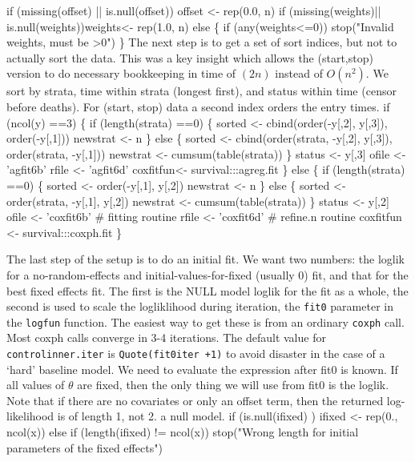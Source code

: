 \documentclass{article}
\begin{document}
    if (missing(offset) || is.null(offset)) offset <- rep(0.0, n)
    if (missing(weights)|| is.null(weights))weights<- rep(1.0, n)
    else \{
        if (any(weights<=0)) stop("Invalid weights, must be >0")
        \}
\nwendcode{}\nwdocspar
The next step is to get a set of sort indices, but not to actually
sort the data.  This was a key insight which allows the (start,stop)
version to do necessary bookkeeping in time of $(2n)$ instead of $O(n^2)$.
We sort by strata, time within strata (longest first), and status within
time (censor before deaths).  For (start, stop) data a second index 
orders the entry times.
\nwenddocs{}\plusendmoddef
    if (ncol(y) ==3) \{
        if (length(strata) ==0) \{
            sorted <- cbind(order(-y[,2], y[,3]), 
                            order(-y[,1]))
            newstrat <- n
            \}
        else \{
            sorted <- cbind(order(strata, -y[,2], y[,3]),
                            order(strata, -y[,1]))
            newstrat  <- cumsum(table(strata))
            \}
        status <- y[,3]
        ofile <-  'agfit6b'
        rfile <-  'agfit6d'
        coxfitfun<- survival:::agreg.fit
        \}
    else \{
        if (length(strata) ==0) \{
            sorted <- order(-y[,1], y[,2])
            newstrat <- n
            \}
        else \{
            sorted <- order(strata, -y[,1], y[,2])
            newstrat <-  cumsum(table(strata))
            \}
        status <- y[,2]
        ofile <- 'coxfit6b' # fitting routine
        rfile <- 'coxfit6d' # refine.n routine
        coxfitfun <- survival:::coxph.fit
        \}
\nwendcode{}\nwdocspar

The last step of the setup is to do an initial fit.  
We want two numbers: the loglik for a  no-random-effects and
initial-values-for-fixed (usually 0)
fit, and that for the best fixed effects fit.
The first is the NULL model loglik for the fit as a whole, the second
is used to scale the logliklihood during iteration, the {\tt{}fit0} parameter
in the {\tt{}logfun} function.
The easiest way to get these is from an ordinary {\tt{}coxph} call.
Most coxph calls converge in 3-4 iterations.  The default value
for {\tt{}control{}inner.iter} is {\tt{}Quote(fit0{}iter\ +1)} to avoid disaster in the
case of a `hard' baseline model. We need to evaluate the expression  %
after fit0 is known.
If all values of $\theta$ are fixed, then the only thing we will
use from fit0 is the loglik.
Note that if there are no covariates or only an offset term, then 
the returned log-likelihood is of length 1, not 2.
a null model.
\nwenddocs{}\endmoddef
if (is.null(ifixed) ) ifixed <- rep(0., ncol(x))
else if (length(ifixed) != ncol(x))
    stop("Wrong length for initial parameters of the fixed effects")
\end{document}
